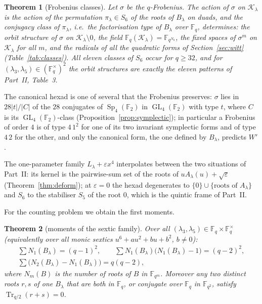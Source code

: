 \documentclass[12pt,a4paper]{amsart}
\newtheorem{theorem}{Theorem}[section]
\theoremstyle{definition}
\newcommand{\F}{\mathbb{F}}
\newcommand{\Tr}{\operatorname{Tr}}
\newcommand{\Sp}{\operatorname{Sp}}
\newcommand{\GL}{\operatorname{GL}}
\newcommand{\eps}{\varepsilon}
\newcommand{\Kk}{\mathcal{K}}
\begin{document}
\begin{theorem}[Frobenius classes]\label{thm:classes}
Let $\sigma$ be the $q$-Frobenius. The action of $\sigma$ on $\Kk_\lambda$ is the action of the permutation $\pi_\lambda\in S_6$ of the roots of $B_\lambda$ on duads, and the conjugacy class of $\pi_\lambda$, i.e.\ the factorisation type of $B_\lambda$ over $\F_q$, determines: the orbit structure of $\sigma$ on $\Kk_\lambda\setminus0$, the field $\F_q(\Kk_\lambda)=\F_{q^{N_0}}$, the fixed spaces of $\sigma^m$ on $\Kk_\lambda$ for all $m$, and the radicals of all the quadratic forms of Section~\ref{sec:witt} (Table~\ref{tab:classes}). All eleven classes of $S_6$ occur for $q\ge32$, and for $(\lambda_3,\lambda_5)\in(\F_q^\times)^2$ the orbit structures are exactly the eleven patterns of Part~II, Table~3.
\end{theorem}

The canonical hexad is one of several that the Frobenius preserves: $\sigma$ lies in $28|t|/|C|$ of the $28$ conjugates of $\Sp_4(\F_2)$ in $\GL_4(\F_2)$ with type $t$, where $C$ is its $\GL_4(\F_2)$-class (Proposition~\ref{prop:symplectic}); in particular a Frobenius of order $4$ is of type $4\,1^2$ for one of its two invariant symplectic forms and of type $4\,2$ for the other, and only the canonical form, the one defined by $B_\lambda$, predicts $W'$.

The one-parameter family $L_\lambda+\eps x^4$ interpolates between the two situations of Part~II: its kernel is the pairwise-sum set of the roots of $uA_\lambda(u)+\sqrt\eps$ (Theorem~\ref{thm:deform}); at $\eps=0$ the hexad degenerates to $\{0\}\cup\{\text{roots of }A_\lambda\}$ and $S_6$ to the stabiliser $S_5$ of the root $0$, which is the quintic frame of Part~II.

For the counting problem we obtain the first moments.

\begin{theorem}[moments of the sextic family]\label{thm:moments}
Over all $(\lambda_3,\lambda_5)\in\F_q\times\F_q^\times$ (equivalently over all monic sextics $u^6+au^2+bu+b^2$, $b\ne0$):
\begin{gather*}
\sum N_1(B_\lambda)=(q-1)^2,\qquad \sum N_1(B_\lambda)\bigl(N_1(B_\lambda)-1\bigr)=(q-2)^2,\\
\sum\bigl(N_2(B_\lambda)-N_1(B_\lambda)\bigr)=q(q-2),
\end{gather*}
where $N_m(B)$ is the number of roots of $B$ in $\F_{q^m}$. Moreover any two distinct roots $r,s$ of one $B_\lambda$ that are both in $\F_q$, or conjugate over $\F_q$ in $\F_{q^2}$, satisfy $\Tr_{q/2}(r+s)=0$.
\end{theorem}
\end{document}
